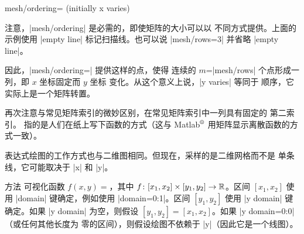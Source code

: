 {\begin{pgfplotskey}{mesh/ordering= (initially x varies)}
\begin{codeexample}[]
\end{codeexample}
    \noindent 注意，|mesh/ordering| 是必需的，即使矩阵的大小可以以
    不同方式提供。上面的示例使用 |empty line| 标记扫描线。也可以说
    |mesh/rows=3| 并省略 |empty line|。

    因此，|mesh/ordering=| 提供这样的点，使得
    连续的 $m$=|mesh/rows| 个点形成一列，即 $x$ 坐标固定而 $y$ 坐标
    变化。从这个意义上说，|y varies| 等同于 
    顺序，它实际上是一个矩阵转置。
\begin{codeexample}[]
\end{codeexample}
    再次注意与常见矩阵索引的微妙区别，在常见矩阵索引中一列具有固定的
    第二索引。\PGFPlots{} 指的是人们在纸上写下函数的方式（这与
    Matlab$^\text{\textregistered}$ 用矩阵显示离散函数的方式一致）。
\end{pgfplotskey}

\begin{addplot3operation}[]{}{}
\label{cmd:addplot3:expr}
    表达式绘图的工作方式也与二维图相同。但现在，采样的是二维网格而不是
    单条线，它可能取决于 |x| 和 |y|。

    方法   可视化函数
    $f(x,y) = $，其中
    $ f \colon [x_1,x_2] \times [y_1,y_2] \to \mathbb{R}$。区间 $[x_1,x_2]$
    使用 |domain| 键确定，例如使用 |domain=0:1|。区间 $[y_1,y_2]$
    使用 |y domain| 键确定。如果 |y domain| 为空，则假设
    $[y_1,y_2] = [x_1,x_2]$。如果 |y domain=0:0|（或任何其他长度为
    零的区间），则假设绘图不依赖于 |y|（因此它是一个线图）。


\end{addplot3operation}}
